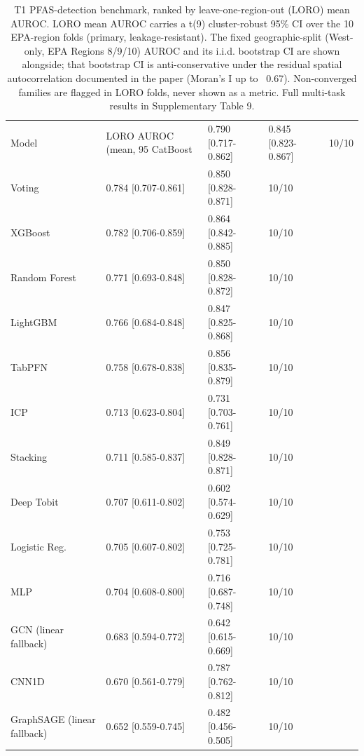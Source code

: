 \begin{table}
\caption{T1 PFAS-detection benchmark, ranked by leave-one-region-out (LORO) mean AUROC. LORO mean AUROC carries a t(9) cluster-robust 95\% CI over the 10 EPA-region folds (primary, leakage-resistant). The fixed geographic-split (West-only, EPA Regions 8/9/10) AUROC and its i.i.d. bootstrap CI are shown alongside; that bootstrap CI is anti-conservative under the residual spatial autocorrelation documented in the paper (Moran's I up to ~0.67). Non-converged families are flagged in LORO folds, never shown as a metric. Full multi-task results in Supplementary Table 9.}
\label{tab:results-condensed}
\begin{tabular}{llll}
\toprule
Model & LORO AUROC (mean, 95%
\midrule
CatBoost & 0.790 [0.717-0.862] & 0.845 [0.823-0.867] & 10/10 \\
Voting & 0.784 [0.707-0.861] & 0.850 [0.828-0.871] & 10/10 \\
XGBoost & 0.782 [0.706-0.859] & 0.864 [0.842-0.885] & 10/10 \\
Random Forest & 0.771 [0.693-0.848] & 0.850 [0.828-0.872] & 10/10 \\
LightGBM & 0.766 [0.684-0.848] & 0.847 [0.825-0.868] & 10/10 \\
TabPFN & 0.758 [0.678-0.838] & 0.856 [0.835-0.879] & 10/10 \\
ICP & 0.713 [0.623-0.804] & 0.731 [0.703-0.761] & 10/10 \\
Stacking & 0.711 [0.585-0.837] & 0.849 [0.828-0.871] & 10/10 \\
Deep Tobit & 0.707 [0.611-0.802] & 0.602 [0.574-0.629] & 10/10 \\
Logistic Reg. & 0.705 [0.607-0.802] & 0.753 [0.725-0.781] & 10/10 \\
MLP & 0.704 [0.608-0.800] & 0.716 [0.687-0.748] & 10/10 \\
GCN (linear fallback) & 0.683 [0.594-0.772] & 0.642 [0.615-0.669] & 10/10 \\
CNN1D & 0.670 [0.561-0.779] & 0.787 [0.762-0.812] & 10/10 \\
GraphSAGE (linear fallback) & 0.652 [0.559-0.745] & 0.482 [0.456-0.505] & 10/10 \\
\bottomrule
\end{tabular}
\end{table}
